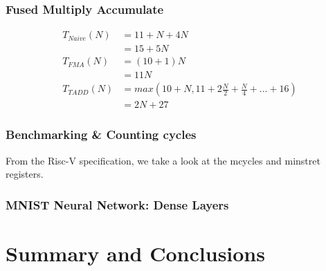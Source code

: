 \documentclass[a4paper,9pt]{report}
\begin{document}
\subsection{Fused Multiply Accumulate}


\begin{align*}
  T_{Naive}(N) &= 11+N + 4N \\
  &= 15 + 5N \\
  T_{FMA}(N) &= (10+1)N \\
             &= 11N \\
  T_{TADD}(N) &= max(10+N, 11+2\frac{N}{2} + \frac{N}{4} + ... + 16) \\
             &= 2N+27 
\end{align*}


\subsection{Benchmarking \& Counting cycles}
From the Risc-V specification, we take a look at the mcycles and minstret
registers.

\subsection{MNIST Neural Network: Dense Layers}

\chapter{Summary and Conclusions} 


\appendix
\singlespacing

 
% 
\end{document}
